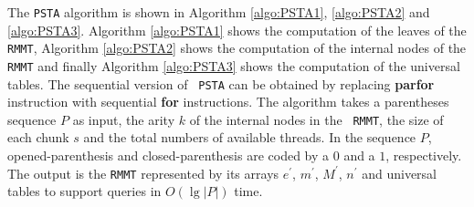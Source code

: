 The {\tt PSTA} algorithm is shown in Algorithm \ref{algo:PSTA1},
\ref{algo:PSTA2} and \ref{algo:PSTA3}. Algorithm \ref{algo:PSTA1}
shows the computation of the leaves of the {\tt RMMT}, Algorithm
\ref{algo:PSTA2} shows the computation of the internal nodes of the
{\tt RMMT} and finally Algorithm \ref{algo:PSTA3} shows the
computation of the universal tables. The sequential version of {\tt
  PSTA} can be obtained by replacing {\bf parfor} instruction with
sequential {\bf for} instructions. The algorithm takes a parentheses
sequence $P$ as input, the arity $k$ of the internal nodes in the {\tt
  RMMT}, the size of each chunk $s$ and the total numbers of available
threads. In the sequence $P$, opened-parenthesis and
closed-parenthesis are coded by a $0$ and a $1$, respectively. The
output is the {\tt RMMT} represented by its arrays $e^{\prime}$,
$m^{\prime}$, $M^{\prime}$, $n^{\prime}$ and universal tables to
support queries in $O(\lg|P|)$ time.

